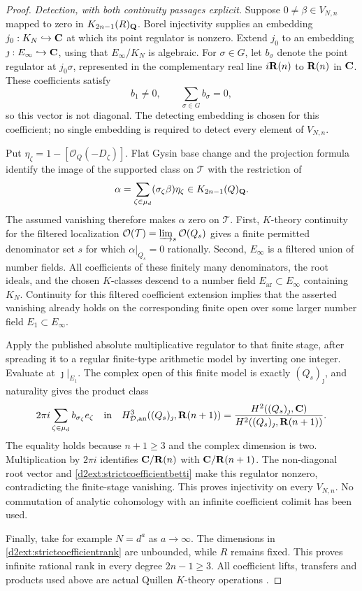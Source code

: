 \begin{proof}
\emph{Detection, with both continuity passages explicit.}
Suppose $0\ne\beta\in V_{N,n}$ mapped to zero in
$K_{2n-1}(R)_{\mathbf Q}$. Borel injectivity \cite[Section~6]{BunkeTamme} supplies an embedding
$j_0:K_N\hookrightarrow\mathbf C$ at which its point regulator
is nonzero. Extend $j_0$ to an embedding
$\jmath:E_\infty\hookrightarrow\mathbf C$, using that
$E_\infty/K_N$ is algebraic.
For $\sigma\in G$, let $b_\sigma$ denote the point regulator
at $j_0\sigma$, represented in the complementary real line
$i\mathbf R(n)$ to $\mathbf R(n)$ in $\mathbf C$. These coefficients satisfy
\[
 b_1\ne0,\qquad \sum_{\sigma\in G}b_\sigma=0,
\]
so this vector is not diagonal. The detecting embedding is
chosen for this coefficient; no single embedding is required
to detect every element of $V_{N,n}$.

Put $\eta_\zeta=1-[\mathcal O_Q(-D_\zeta)]$. Flat Gysin
base change and the projection formula identify the image of
the supported class on $\mathcal T$ with the restriction of
\[
 \alpha=\sum_{\zeta\in\mu_d}(\sigma_\zeta\beta)\eta_\zeta
       \in K_{2n-1}(Q)_{\mathbf Q}.
\]
The assumed vanishing therefore makes $\alpha$ zero on
$\mathcal T$. First, $K$-theory continuity for the filtered
localization
$\mathcal O(\mathcal T)=\varinjlim_s\mathcal O(Q_s)$
gives a finite permitted denominator set $s$ for which
$\alpha|_{Q_s}=0$ rationally.
Second, $E_\infty$ is a filtered union of number fields.
All coefficients of these finitely many denominators, the
root ideals, and the chosen $K$-classes descend to a number
field $E_{\mathrm{ar}}\subset E_\infty$ containing $K_N$.
Continuity for this filtered coefficient extension implies
that the asserted vanishing already holds on the corresponding
finite open over some larger number field
$E_1\subset E_\infty$.

Apply the published absolute multiplicative regulator to that
finite stage, after spreading it to a regular finite-type
arithmetic model by inverting one integer. Evaluate at
$\jmath|_{E_1}$. The complex open of this finite model is exactly
$(Q_s)_\jmath$, and naturality gives the product class
\[
 2\pi i\sum_{\zeta\in\mu_d}b_{\sigma_\zeta}e_\zeta
 \quad\text{in}\quad
 H^3_{\mathcal D,\mathrm{an}}((Q_s)_\jmath,\mathbf R(n+1))
 =\frac{H^2((Q_s)_\jmath,\mathbf C)}
        {H^2((Q_s)_\jmath,\mathbf R(n+1))}.
\]
The equality holds because $n+1\ge3$ and the complex
dimension is two. Multiplication by $2\pi i$ identifies
$\mathbf C/\mathbf R(n)$ with $\mathbf C/\mathbf R(n+1)$. The non-diagonal root
vector and \eqref{d2ext:strictcoefficientbetti} make this
regulator nonzero, contradicting the finite-stage vanishing.
This proves injectivity on every $V_{N,n}$.
No commutation of analytic cohomology with an infinite
coefficient colimit has been used.

Finally, take for example $N=d^a$ as $a\to\infty$.
The dimensions in \eqref{d2ext:strictcoefficientrank} are
unbounded, while $R$ remains fixed. This proves infinite
rational rank in every degree $2n-1\ge3$.
All coefficient lifts, transfers and products used above are
actual Quillen $K$-theory operations
\cite{Quillen,QuillenFinite,Weibel,Borel,BunkeTamme}.
\end{proof}

